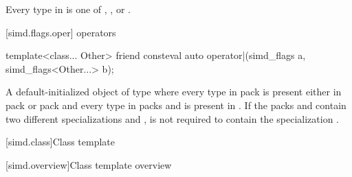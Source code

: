 \pnum\constraints
Every type in  is one of \tcode{\convertflag},
\tcode{\alignedflag}, or .

[simd.flags.oper]{ operators}

\begin{itemdecl}
template<class... Other>
  friend consteval auto operator|(simd_flags a, simd_flags<Other...> b);
\end{itemdecl}

\begin{itemdescr}
  \pnum\returns
  A default-initialized object of type  where
  every type in pack  is present either in pack  or
  pack  and every type in packs  and  is
  present in .
  If the packs  and  contain two
  different specializations  and
  ,  is not required to contain the
  specialization .
\end{itemdescr}

[simd.class]{Class template }

[simd.overview]{Class template  overview}

